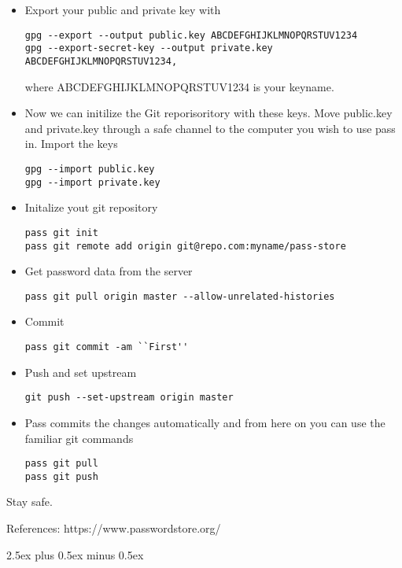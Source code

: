 \documentclass{article}
\begin{document}
\begin{itemize}
\item Export your public and private key with \\
  \begin{verbatim}
gpg --export --output public.key ABCDEFGHIJKLMNOPQRSTUV1234 
gpg --export-secret-key --output private.key ABCDEFGHIJKLMNOPQRSTUV1234,
  \end{verbatim}
  where ABCDEFGHIJKLMNOPQRSTUV1234 is your keyname.\\
\item Now we can initilize the Git reporisoritory with these keys. Move public.key and private.key through a safe channel to the computer you wish to use pass in. Import the keys \\
\begin{verbatim}
gpg --import public.key
gpg --import private.key
\end{verbatim}
\item Initalize yout git repository\\
\begin{verbatim}
pass git init 
pass git remote add origin git@repo.com:myname/pass-store
 \end{verbatim}
\item Get password data from the server 
\begin{verbatim}
pass git pull origin master --allow-unrelated-histories
\end{verbatim}
\item Commit\\
\begin{verbatim}
pass git commit -am ``First'' 
\end{verbatim}
\item Push and set upstream \\
\begin{verbatim}
git push --set-upstream origin master 
\end{verbatim}
\item Pass commits the changes automatically and from here on you can use the familiar git commands \\
\begin{verbatim}
pass git pull 
pass git push 
\end{verbatim}
\end{itemize}
Stay safe.

\vspace{2cm}
References:
    https://www.passwordstore.org/



%
%
\parindent0pt
\parskip2.5ex plus 0.5ex minus 0.5ex
\end{document}
